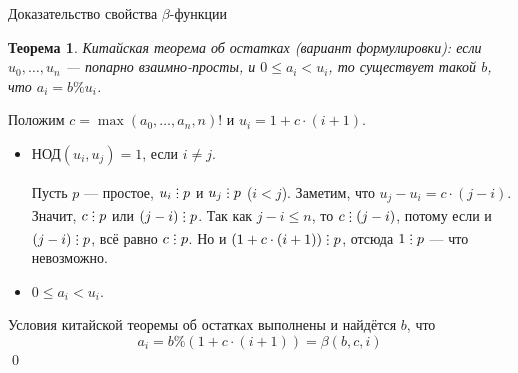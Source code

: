 \documentclass[aspectratio=169]{beamer}
\newtheorem{thm}{Теорема}[section]
\newcommand{\divisible}%
{\mathrel{\lower.2ex%
\vbox{\baselineskip=0.7ex\lineskiplimit=0pt%
\kern6pt \hbox{.}\hbox{.}\hbox{.}}%
}}
\begin{document}
\begin{frame}{Доказательство свойства $\beta$-функции}
\begin{thm}Китайская теорема об остатках (вариант формулировки): если $u_0, \dots, u_n$ --- попарно 
взаимно-просты, и $0 \le a_i < u_i$, то существует такой $b$, что $a_i = b \% u_i$.
\end{thm}\pause
Положим $c = \max(a_0,\dots,a_n,n)!$ и $u_i = 1+c\cdot(i+1)$.\pause
\begin{itemize}
\item $\text{НОД}(u_i,u_j) = 1$, если $i \ne j$.\pause

Пусть $p$ --- простое, $u_i\divisible p$ и $u_j\divisible p$ ($i < j$). \pause
Заметим, что $u_j-u_i = c \cdot (j-i)$. Значит, $c\divisible p$ или $(j-i)\divisible p$. \pause
Так как $j-i \le n$, то $c \divisible (j-i)$, потому если и $(j-i)\divisible p$, всё равно $c \divisible p$. \pause
Но и $(1+c\cdot(i+1))\divisible p$, отсюда $1 \divisible p$ --- что невозможно. \pause
\item $0 \le a_i < u_i$.\pause
\end{itemize}
Условия китайской теоремы об остатках выполнены и найдётся $b$, что \vspace{-0.2cm}
$$a_i = b \% (1 + c\cdot(i+1)) = \beta(b,c,i)$$
\qed
\end{frame}
\end{document}
